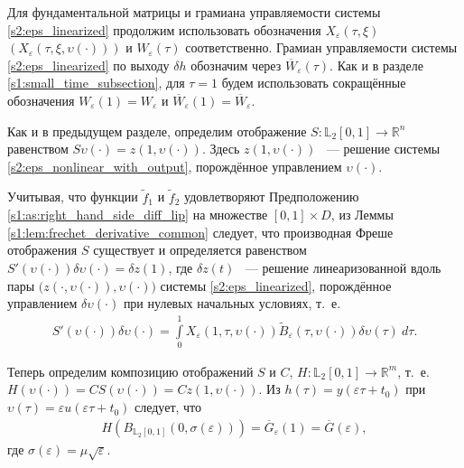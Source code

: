\documentclass[../main.tex]{subfiles}
\begin{document}
Для фундаментальной матрицы и грамиана управляемости системы \eqref{s2:eps_linearized} продолжим использовать обозначения $ X_{\varepsilon}(\tau,\xi) $ $(X_{\varepsilon}(\tau, \xi, \upsilon(\cdot)))$ и $W_{\varepsilon}(\tau)$ соответственно. 
Грамиан управляемости системы \eqref{s2:eps_linearized} по выходу $ \delta h$ обозначим через $\overline{W}_{\varepsilon}(\tau)$. 
Как и в разделе \ref{s1:small_time_subsection}, для $\tau = 1$ будем использовать сокращённые обозначения $W_{\varepsilon}(1) = W_{\varepsilon}$ и $\overline{W}_{\varepsilon}(1) = \overline{W}_{\varepsilon}$. 

Как и в предыдущем разделе, определим отображение $S: \mathbb{L}_2[0,1] \rightarrow \mathbb{R}^n $ равенством $S\upsilon(\cdot) = z(1,\upsilon(\cdot))$.
Здесь $ z(1,\upsilon(\cdot))$ ~--- решение системы \eqref{s2:eps_nonlinear_with_output}, порождённое управлением $\upsilon(\cdot)$. 

Учитывая, что функции $\widetilde{f}_1$ и $\widetilde{f}_2$ удовлетворяют Предположению \ref{s1:as:right_hand_side_diff_lip} на множестве $[0, 1]\times D$, из Леммы \ref{s1:lem:frechet_derivative_common} следует, что производная Фреше отображения $S$ существует и определяется равенством $ S'(\upsilon(\cdot))\delta \upsilon(\cdot) = \delta z(1)$, где $\delta z(t)$ ~--- решение линеаризованной вдоль пары $\big( z(\cdot,\upsilon(\cdot)),\upsilon(\cdot)\big) $ системы \eqref{s2:eps_linearized}, порождённое управлением $\delta \upsilon(\cdot)$ при нулевых начальных условиях, т.~е.
\begin{gather}\label{s2:freсhet_differential_of_scaled_map}
	S'(\upsilon(\cdot))\delta \upsilon(\cdot) = \int\limits_0^1 X_{\varepsilon}(1, \tau, \upsilon(\cdot)) \widetilde{B}_{\varepsilon}(\tau, \upsilon(\cdot)) \delta\upsilon(\tau)\ d\tau. 
\end{gather}

 Теперь определим композицию отображений $ S $ и $ C $, $ H: \mathbb{L}_2[0,1] \rightarrow \mathbb{R}^m $, т.~е. $ H(\upsilon(\cdot)) = C S(\upsilon(\cdot)) = C z(1,\upsilon(\cdot)) $. 
Из $h(\tau) = y(\varepsilon \tau + t_0)$ при $ \upsilon(\tau) = \varepsilon u(\varepsilon \tau + t_0) $ следует, что 
\begin{gather*}
	H(B_{\mathbb{L}_2[0,1]}(0,\sigma(\varepsilon))) = \overline{G}_{\varepsilon}(1) = \overline{G}(\varepsilon), 
\end{gather*}
где $ \sigma(\varepsilon) = \mu \sqrt{\varepsilon} $.
\end{document}

